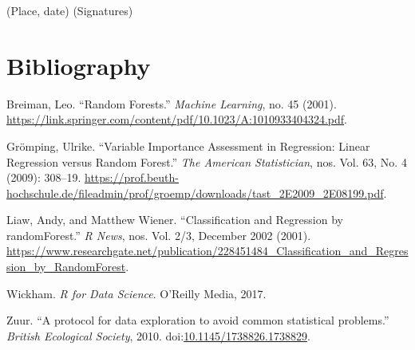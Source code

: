 \documentclass[a4paper, nobind]{templates/ociamthesis}
\newcommand*{\bibtitle}{Works Cited}
\begin{document}
(Place, date) (Signatures)

\hypertarget{bibliography}{%
\chapter{Bibliography}\label{bibliography}}

\hypertarget{refs}{}
\leavevmode\hypertarget{ref-Breiman2001}{}%
Breiman, Leo. ``Random Forests.'' \emph{Machine Learning}, no. 45 (2001). \url{https://link.springer.com/content/pdf/10.1023/A:1010933404324.pdf}.

\leavevmode\hypertarget{ref-Groemping2009}{}%
Grömping, Ulrike. ``Variable Importance Assessment in Regression: Linear Regression versus Random Forest.'' \emph{The American Statistician}, nos. Vol. 63, No. 4 (2009): 308--19. \url{https://prof.beuth-hochschule.de/fileadmin/prof/groemp/downloads/tast_2E2009_2E08199.pdf}.

\leavevmode\hypertarget{ref-Liaw2002}{}%
Liaw, Andy, and Matthew Wiener. ``Classification and Regression by randomForest.'' \emph{R News}, nos. Vol. 2/3, December 2002 (2001). \url{https://www.researchgate.net/publication/228451484_Classification_and_Regression_by_RandomForest}.

\leavevmode\hypertarget{ref-Hadley2017}{}%
Wickham. \emph{R for Data Science}. O'Reilly Media, 2017.

\leavevmode\hypertarget{ref-Zuur2010}{}%
Zuur. ``A protocol for data exploration to avoid common statistical problems.'' \emph{British Ecological Society}, 2010. doi:\href{https://doi.org/10.1145/1738826.1738829}{10.1145/1738826.1738829}.




\setlength{\baselineskip}{0pt} %

{\renewcommand*\MakeUppercase[1]{#1}%
\printbibliography[heading=bibintoc,title={\bibtitle}]}
\end{document}
